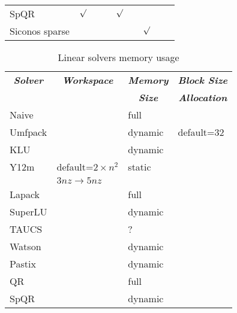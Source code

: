 \begin{table}
\begin{tabular}{lcccccccc}
	SpQR		& $\surd$ &         &         & $\surd$   &           &         &         &	    \\ 
        Siconos sparse  &         &         &         &           &           & $\surd$ &         &         \\ 
\hline
\end{tabular}
\end{table}

\begin{table}
\centering
\caption{Linear solvers memory usage}\label{tab:linear-solvers-memory}
\begin{tabular}{llll}
\hline
	\multicolumn{1}{c}{\textbf{\emph{Solver}}} &
	\multicolumn{1}{c}{\textbf{\emph{Workspace}}} &
	\multicolumn{1}{c}{\textbf{\emph{Memory}}} &
	\multicolumn{1}{c}{\textbf{\emph{Block Size}}} \\
	&
	&
	\multicolumn{1}{c}{\textbf{\emph{Size}}} &
	\multicolumn{1}{c}{\textbf{\emph{Allocation}}} \\
\hline\hline
	Naive		& 			& full		&		\\
	Umfpack 	& 			& dynamic	& default=32	\\
	KLU 		& 			& dynamic	& 		\\
	Y12m 		& default=$2\times{n^2}$& static	&		\\
			& $3nz \rightarrow 5nz$	&		&		\\
	Lapack		&			& full		&		\\
	SuperLU		& 			& dynamic 	&		\\
	TAUCS		&			& ?		&		\\
	Watson		&			& dynamic	&		\\
	Pastix		&			& dynamic	&		\\
	QR		&			& full		&		\\
	SpQR		&			& dynamic	&		\\
\hline
\end{tabular}
\end{table}

